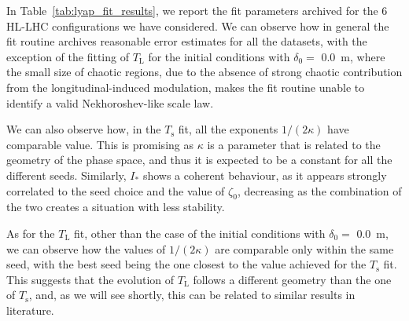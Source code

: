In Table~\ref{tab:lyap_fit_results}, we report the fit parameters archived for the 6 HL-LHC configurations we have considered. We can observe how in general the fit routine archives reasonable error estimates for all the datasets, with the exception of the fitting of $T_\mathrm{L}$ for the initial conditions with $\delta_0 =$ \SI{0.0}{\metre}, where the small size of chaotic regions, due to the absence of strong chaotic contribution from the longitudinal-induced modulation, makes the fit routine unable to identify a valid Nekhoroshev-like scale law.

We can also observe how, in the $T_\mathrm{s}$ fit, all the exponents $1/(2\kappa)$ have comparable value. This is promising as $\kappa$ is a parameter that is related to the geometry of the phase space, and thus it is expected to be a constant for all the different seeds. Similarly, $I_\ast$ shows a coherent behaviour, as it appears strongly correlated to the seed choice and the value of $\zeta_0$, decreasing as the combination of the two creates a situation with less stability.

As for the $T_\mathrm{L}$ fit, other than the case of the initial conditions with $\delta_0 =$ \SI{0.0}{\metre}, we can observe how the values of $1/(2\kappa)$ are comparable only within the same seed, with the best seed being the one closest to the value achieved for the $T_\mathrm{s}$ fit. This suggests that the evolution of $T_\mathrm{L}$ follows a different geometry than the one of $T_\mathrm{s}$, and, as we will see shortly, this can be related to similar results in literature. 

